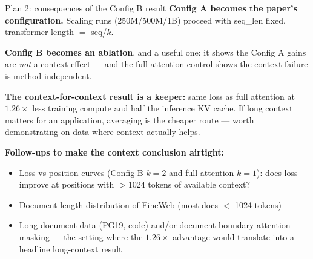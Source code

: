 \documentclass[10pt,aspectratio=169]{beamer}
\begin{document}
\begin{frame}{Plan 2: consequences of the Config B result}
  \textbf{Config A becomes the paper's configuration.} Scaling runs
  (250M/500M/1B) proceed with seq\_len fixed, transformer length $=$ seq/$k$.

  \vspace{0.5em}
  \textbf{Config B becomes an ablation}, and a useful one: it shows the
  Config A gains are \emph{not} a context effect --- and the full-attention
  control shows the context failure is method-independent.

  \vspace{0.5em}
  \textbf{The context-for-context result is a keeper:} same loss as full
  attention at $1.26\times$ less training compute and half the inference KV
  cache. If long context matters for an application, averaging is the cheaper
  route --- worth demonstrating on data where context actually helps.

  \vspace{0.5em}
  \textbf{Follow-ups to make the context conclusion airtight:}
  \begin{itemize}
    \item Loss-vs-position curves (Config B $k{=}2$ and full-attention
          $k{=}1$): does loss improve at positions with $>$1024 tokens of
          available context?
    \item Document-length distribution of FineWeb (most docs $<$ 1024 tokens)
    \item Long-document data (PG19, code) and/or document-boundary attention
          masking --- the setting where the $1.26\times$ advantage would
          translate into a headline long-context result
  \end{itemize}
\end{frame}
\end{document}

